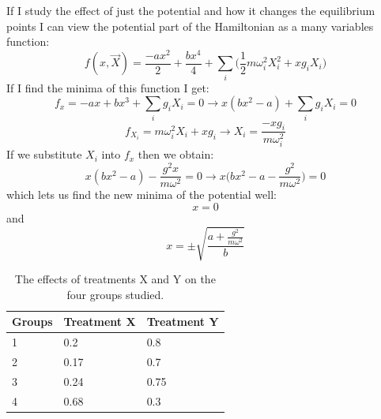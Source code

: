 \documentclass[idxtotoc,hyperref,openany]{labbook} %
\begin{document}
If I study the effect of just the potential and how it changes the equilibrium points I can view the potential part of the Hamiltonian as a many variables function:
\begin{equation}
f(x,\vec{X})=\frac{-ax^2}{2}+\frac{bx^4}{4}+\sum_i \Big( \frac{1}{2}m\omega_i^2X_i^2+xg_iX_i\Big)
\end{equation}
If I find the minima of this function I get:
\begin{equation}
f_x=-ax+bx^3+\sum_i g_iX_i=0 \rightarrow x(bx^2-a)+\sum_i g_iX_i=0 

\end{equation}
\begin{equation}
f_{X_i}=m\omega_i^2 X_i +xg_i \rightarrow X_i=\frac{-xg_i}{m\omega_i^2}
\end{equation}
If we substitute $X_i$ into  $f_x$ then we obtain:
\begin{equation}
x(bx^2-a)-\frac{g^2x}{m\omega^2}=0\rightarrow x\Big(bx^2-a-\frac{g^2}{m\omega^2}\Big)=0
\end{equation}
which lets us find the new minima of the potential well:
\begin{equation}
x=0
\end{equation}
and 
\begin{equation}
x=\pm \sqrt{\frac{a+\frac{g^2}{m\omega^2}}{b}}
\end{equation}





\lipsum[3-5]




\begin{table}[H]
\begin{tabular}{l l l}
\toprule
\textbf{Groups} & \textbf{Treatment X} & \textbf{Treatment Y} \\
\toprule
1 & 0.2 & 0.8\\
2 & 0.17 & 0.7\\
3 & 0.24 & 0.75\\
4 & 0.68 & 0.3\\
\bottomrule
\end{tabular}
\caption{The effects of treatments X and Y on the four groups studied.}
\label{tab:treatments_xy}
\end{table}
\end{document}
